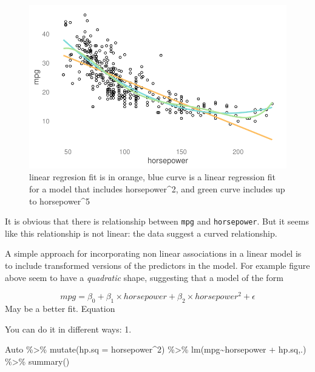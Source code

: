\documentclass[
  letterpaper,
  DIV=11,
  numbers=noendperiod]{scrreprt}
\newenvironment{Shaded}{\begin{snugshade}}{\end{snugshade}}
\newcommand{\AttributeTok}[1]{\textcolor[rgb]{0.65,0.35,0.00}{#1}}
\newcommand{\DecValTok}[1]{\textcolor[rgb]{0.47,0.16,0.63}{#1}}
\newcommand{\FunctionTok}[1]{\textcolor[rgb]{0.02,0.16,0.49}{#1}}
\newcommand{\NormalTok}[1]{\textcolor[rgb]{0.33,0.33,0.33}{#1}}
\newcommand{\SpecialCharTok}[1]{\textcolor[rgb]{0.00,0.46,0.62}{#1}}
\begin{document}
\begin{figure}[H]

{\centering \includegraphics{Chapter3_files/figure-pdf/unnamed-chunk-85-1.pdf}

}

\caption{linear regresion fit is in orange, blue curve is a linear
regression fit for a model that includes horsepower\^{}2, and green
curve includes up to horsepower\^{}5}

\end{figure}

It is obvious that there is relationship between \texttt{mpg} and
\texttt{horsepower}. But it seems like this relationship is not linear:
the data suggest a curved relationship.

A simple approach for incorporating non linear associations in a linear
model is to include transformed versions of the predictors in the model.
For example figure above seem to have a \emph{quadratic} shape,
suggesting that a model of the form

\[
mpg = \beta_0 + \beta_1 \times horsepower + \beta_2 \times horsepower^2 + \epsilon
\] May be a better fit. Equation

You can do it in different ways: 1.

\begin{Shaded}
\begin{Highlighting}[]
\NormalTok{Auto }\SpecialCharTok{\%\textgreater{}\%} 
  \FunctionTok{mutate}\NormalTok{(}\AttributeTok{hp.sq =}\NormalTok{ horsepower}\SpecialCharTok{\^{}}\DecValTok{2}\NormalTok{) }\SpecialCharTok{\%\textgreater{}\%} 
  \FunctionTok{lm}\NormalTok{(mpg}\SpecialCharTok{\textasciitilde{}}\NormalTok{horsepower }\SpecialCharTok{+}\NormalTok{ hp.sq,.) }\SpecialCharTok{\%\textgreater{}\%} 
  \FunctionTok{summary}\NormalTok{()}
\end{Highlighting}
\end{Shaded}
\end{document}
